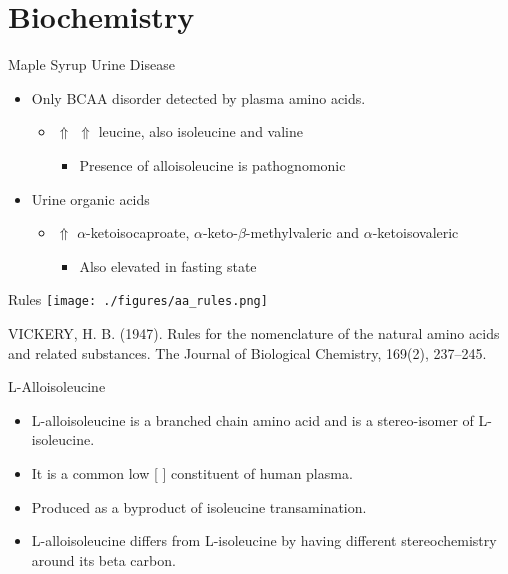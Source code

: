\documentclass[presentation, smaller]{beamer}
\begin{document}
\section{Biochemistry}
\label{sec:orgheadline13}
\begin{frame}[label={sec:orgheadline4}]{Maple Syrup Urine Disease}
\begin{itemize}
\item Only BCAA disorder detected by plasma amino acids.
\begin{itemize}
\item \(\Uparrow\) \(\Uparrow\) leucine, also isoleucine and valine
\begin{itemize}
\item Presence of alloisoleucine is pathognomonic
\end{itemize}
\end{itemize}
\item Urine organic acids
\begin{itemize}
\item \(\Uparrow\) \(\alpha\)-ketoisocaproate,
\(\alpha\)-keto-\(\beta\)-methylvaleric and \(\alpha\)-ketoisovaleric
\begin{itemize}
\item Also elevated in fasting state
\end{itemize}
\end{itemize}
\end{itemize}
\end{frame}
\begin{frame}[label={sec:orgheadline5}]{Rules}
\texttt{[image: ./figures/aa\_rules.png]}


VICKERY, H. B. (1947). Rules for the nomenclature of the natural amino
acids and related substances. The Journal of Biological Chemistry,
169(2), 237–245.
\end{frame}

\begin{frame}[label={sec:orgheadline6}]{L-Alloisoleucine}
\begin{itemize}
\item L-alloisoleucine is a branched chain amino acid and is a
stereo-isomer of L-isoleucine.
\item It is a common low [ ] constituent of human plasma.
\item Produced as a byproduct of isoleucine transamination.
\item L-alloisoleucine differs from L-isoleucine by having
different stereochemistry around its beta carbon.
\end{itemize}

\centering
{}
\end{frame}
\end{document}
